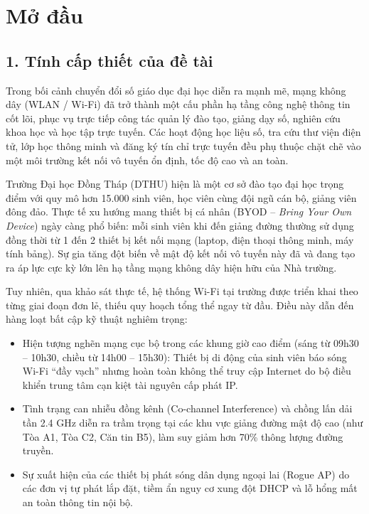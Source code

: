 \chapter*{Mở đầu}

\section*{1. Tính cấp thiết của đề tài}

Trong bối cảnh chuyển đổi số giáo dục đại học diễn ra mạnh mẽ, mạng không dây (WLAN / Wi-Fi) đã trở thành một cấu phần hạ tầng công nghệ thông tin cốt lõi, phục vụ trực tiếp công tác quản lý đào tạo, giảng dạy số, nghiên cứu khoa học và học tập trực tuyến. Các hoạt động học liệu số, tra cứu thư viện điện tử, lớp học thông minh và đăng ký tín chỉ trực tuyến đều phụ thuộc chặt chẽ vào một môi trường kết nối vô tuyến ổn định, tốc độ cao và an toàn.

Trường Đại học Đồng Tháp (DTHU) hiện là một cơ sở đào tạo đại học trọng điểm với quy mô hơn 15.000 sinh viên, học viên cùng đội ngũ cán bộ, giảng viên đông đảo. Thực tế xu hướng mang thiết bị cá nhân (BYOD -- \textit{Bring Your Own Device}) ngày càng phổ biến: mỗi sinh viên khi đến giảng đường thường sử dụng đồng thời từ 1 đến 2 thiết bị kết nối mạng (laptop, điện thoại thông minh, máy tính bảng). Sự gia tăng đột biến về mật độ kết nối vô tuyến này đã và đang tạo ra áp lực cực kỳ lớn lên hạ tầng mạng không dây hiện hữu của Nhà trường.

Tuy nhiên, qua khảo sát thực tế, hệ thống Wi-Fi tại trường được triển khai theo từng giai đoạn đơn lẻ, thiếu quy hoạch tổng thể ngay từ đầu. Điều này dẫn đến hàng loạt bất cập kỹ thuật nghiêm trọng:
\begin{itemize}
    \item Hiện tượng nghẽn mạng cục bộ trong các khung giờ cao điểm (sáng từ 09h30 -- 10h30, chiều từ 14h00 -- 15h30): Thiết bị di động của sinh viên báo sóng Wi-Fi ``đầy vạch'' nhưng hoàn toàn không thể truy cập Internet do bộ điều khiển trung tâm cạn kiệt tài nguyên cấp phát IP.
    \item Tình trạng can nhiễu đồng kênh (Co-channel Interference) và chồng lấn dải tần 2.4 GHz diễn ra trầm trọng tại các khu vực giảng đường mật độ cao (như Tòa A1, Tòa C2, Căn tin B5), làm suy giảm hơn 70\% thông lượng đường truyền.
    \item Sự xuất hiện của các thiết bị phát sóng dân dụng ngoại lai (Rogue AP) do các đơn vị tự phát lắp đặt, tiềm ẩn nguy cơ xung đột DHCP và lỗ hổng mất an toàn thông tin nội bộ.
\end{itemize}

